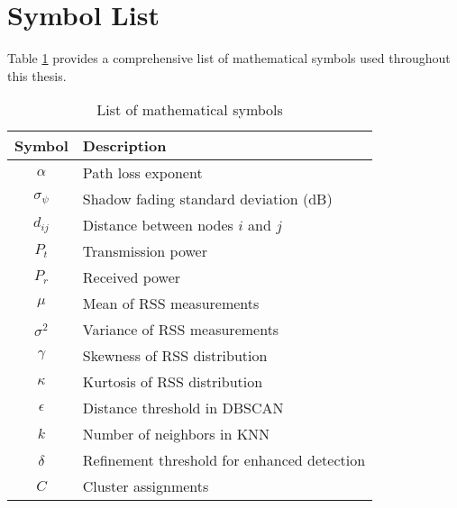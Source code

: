 \section{Symbol List}
\label{app:symbols}

Table \ref{tab:symbols} provides a comprehensive list of mathematical symbols used throughout this thesis.

\begin{table}[htbp]
    \centering
    \caption{List of mathematical symbols}
    \label{tab:symbols}
    \begin{tabular}{cl}
        \toprule
        \textbf{Symbol} & \textbf{Description} \\
        \midrule
        $\alpha$ & Path loss exponent \\
        $\sigma_{\psi}$ & Shadow fading standard deviation (dB) \\
        $d_{ij}$ & Distance between nodes $i$ and $j$ \\
        $P_t$ & Transmission power \\
        $P_r$ & Received power \\
        $\mu$ & Mean of RSS measurements \\
        $\sigma^2$ & Variance of RSS measurements \\
        $\gamma$ & Skewness of RSS distribution \\
        $\kappa$ & Kurtosis of RSS distribution \\
        $\epsilon$ & Distance threshold in DBSCAN \\
        $k$ & Number of neighbors in KNN \\
        $\delta$ & Refinement threshold for enhanced detection \\
        $C$ & Cluster assignments \\
        \bottomrule
    \end{tabular}
\end{table}
